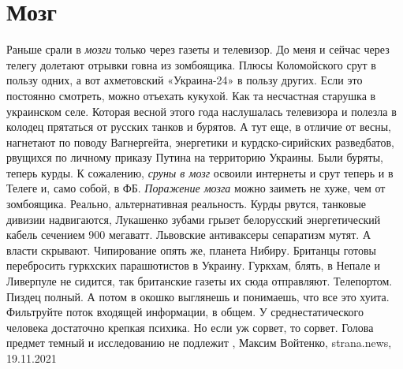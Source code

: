  
 
 
 
 
\chapter{Мозг}
\label{sec:slova.mozg}

Раньше срали в \emph{мозги} только через газеты и телевизор. До меня и сейчас
через телегу долетают отрывки говна из зомбоящика. Плюсы Коломойского срут в
пользу одних, а вот ахметовский «Украина-24» в пользу других. Если это
постоянно смотреть, можно отъехать кукухой. Как та несчастная старушка в
украинском селе.  Которая весной этого года наслушалась телевизора и полезла в
колодец прятаться от русских танков и бурятов. А тут еще, в отличие от весны,
нагнетают по поводу Вагнергейта, энергетики и курдско-сирийских разведбатов,
рвущихся по личному приказу Путина на территорию Украины. Были буряты, теперь
курды.  К сожалению, \emph{сруны в мозг} освоили интернеты и срут теперь и в
Телеге и, само собой, в ФБ. \emph{Поражение мозга} можно заиметь не хуже, чем
от зомбоящика. Реально, альтернативная реальность. Курды рвутся, танковые
дивизии надвигаются, Лукашенко зубами грызет белорусский энергетический кабель
сечением 900 мегаватт. Львовские антиваксеры сепаратизм мутят. А власти
скрывают.  Чипирование опять же, планета Нибиру. Британцы готовы перебросить
гуркхских парашютистов в Украину. Гуркхам, блять, в Непале и Ливерпуле не
сидится, так британские газеты их сюда отправляют. Телепортом.  Пиздец полный.
А потом в окошко выглянешь и понимаешь, что все это хуита.  Фильтруйте поток
входящей информации, в общем. У среднестатического человека достаточно крепкая
психика. Но если уж сорвет, то сорвет. Голова предмет темный и исследованию не
подлежит
, 
Максим Войтенко, strana.news, 19.11.2021
